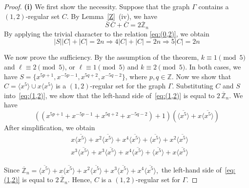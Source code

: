 \documentclass[12pt]{article}
\begin{document}
\begin{proof}
\textbf{(i)} We first show the necessity. Suppose that the graph $\Gamma$ contains a $(1,2)$-regular set $C$. By Lemma~\ref{Z}~(iv), we have
\begin{equation}\label{eq:(1,2)}
	\overline{S}\,\overline{C}+\overline{C}
	=2\overline{\mathbb{Z}}_{n}
\end{equation}
By applying the trivial character to the relation \eqref{eq:(0,2)}, we obtain
\[
|S||C|+|C|=2n \Longrightarrow
4|C|+|C|=2n \Longrightarrow 5|C|=2n
\]

We now prove the sufficiency. By the assumption of the theorem,
\(k\equiv 1 \pmod{5}\) and \(\ell\equiv 2 \pmod{5}\), or \(\ell\equiv 1 \pmod{5}\) and \(k\equiv 2 \pmod{5}\). In both cases, we have $S=\{x^{5p+1},x^{-5p-1},x^{5q+2},x^{-5q-2}\}$, where \(p,q\in\mathbb{Z}\).
Now we show that
$C=\langle x^{5}\rangle \cup x \langle x^{5}\rangle  $
is a $(1,2)$-regular set for the graph $\Gamma$.
Substituting $C$ and $S$ into~\eqref{eq:(1,2)}, we show that the left-hand side of~\eqref{eq:(1,2)} is equal to $2\,\overline{\mathbb{Z}}_{n}$. We have
\[
\left(\left(x^{5p+1}+x^{-5p-1}+x^{5q+2}+x^{-5q-2}\right)+1\right)
\left(\overline{\langle x^{5}\rangle}
+x\overline{\langle x^{5}\rangle}\right)
\]
After simplification, we obtain
\[
\begin{aligned}
	&x\overline{\langle x^{5}\rangle}
	+x^{2}\overline{\langle x^{5}\rangle}
	+x^4\overline{\langle x^{5}\rangle}
	+\overline{\langle x^{5}\rangle}
	+x^{2}\overline{\langle x^{5}\rangle}\\
	&x^{3}\overline{\langle x^{5}\rangle}
	+x^{3}\overline{\langle x^{5}\rangle}
	+x^{4}\overline{\langle x^{5}\rangle}
	+\overline{\langle x^{5}\rangle}
	+x\overline{\langle x^{5}\rangle}
\end{aligned}
\]

Since
$
\overline{\mathbb{Z}}_{n}
=
\overline{\langle x^{5}\rangle}
+x\overline{\langle x^{5}\rangle}
+x^{2}\overline{\langle x^{5}\rangle}+x^{3}\overline{\langle x^{5}\rangle}+x^{4}\overline{\langle x^{5}\rangle},
$
the left-hand side of~\eqref{eq:(1,2)} is equal to
$2\,\overline{\mathbb{Z}}_{n}$.
Hence, $C$ is a $(1,2)$-regular set for $\Gamma$.		


\end{proof}
\end{document}
